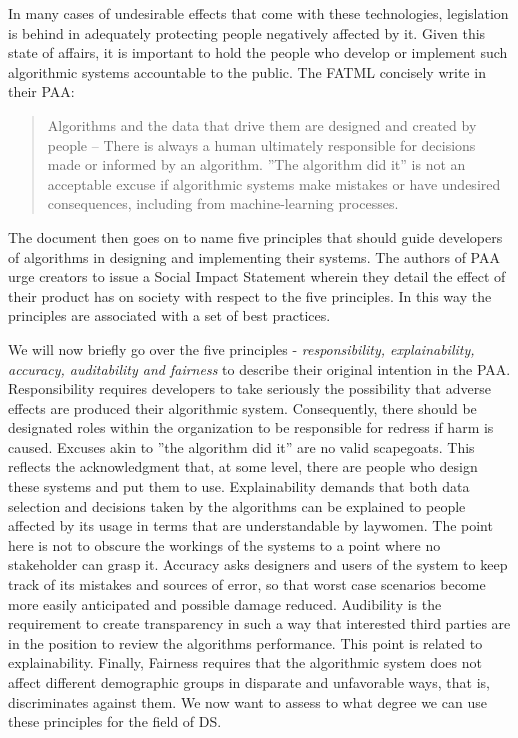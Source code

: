 \documentclass{article}
\begin{document}
In many cases of undesirable effects that come with these technologies, legislation is behind in adequately protecting people negatively affected by it.
Given this state of affairs, it is important to hold the people who develop or implement such algorithmic systems accountable to the public. The FATML concisely write in their PAA: 
\begin{quote}
Algorithms and the data that drive them are designed and created by people -- There is always a human ultimately responsible for decisions made or informed by an algorithm. ''The algorithm did it'' is not an acceptable excuse if algorithmic systems make mistakes or have undesired consequences, including from machine-learning processes.
\end{quote}\cite{principles}

The document then goes on to name five principles that should guide developers of algorithms in designing and implementing their systems. The authors of PAA urge creators to issue a Social Impact Statement wherein they detail the effect of their product has on society with respect to the five principles. In this way the principles are associated with a set of best practices.

We will now briefly go over the five principles - \emph{responsibility, explainability, accuracy, auditability and fairness} to describe their original intention in the PAA.
Responsibility requires developers to take seriously the possibility that adverse effects are produced their algorithmic system. Consequently, there should be designated roles within the organization to be responsible for redress if harm is caused. Excuses akin to ''the algorithm did it'' are no valid scapegoats. This reflects the acknowledgment that, at some level, there are people who design these systems and put them to use.
Explainability demands that both data selection and decisions taken by the algorithms can be explained to people affected by its usage in terms that are understandable by laywomen. The point here is not to obscure the workings of the systems to a point where no stakeholder can grasp it.
Accuracy asks designers and users of the system to keep track of its mistakes and sources of error, so that worst case scenarios become more easily anticipated and possible damage reduced.
Audibility is the requirement to create transparency in such a way that interested third parties are in the position to review the algorithms performance. This point is related to explainability.
Finally, Fairness requires that the algorithmic system does not affect different demographic groups in disparate and unfavorable ways, that is, discriminates against them.
We now want to assess to what degree we can use these principles for the field of DS.
\end{document}
